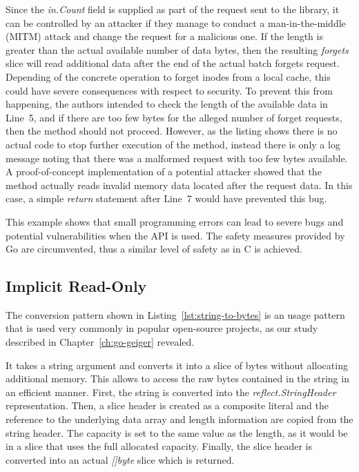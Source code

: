 Since the \textit{in.Count} field is supplied as part of the request sent to the library, it can be controlled by an
attacker if they manage to conduct a man-in-the-middle (\acrshort{MITM}) attack and change the request for a malicious
one.
If the length is greater than the actual available number of data bytes, then the resulting \textit{forgets} slice will
read additional data after the end of the actual batch forgets request.
Depending of the concrete operation to forget inodes from a local cache, this could have severe consequences with
respect to security.
To prevent this from happening, the authors intended to check the length of the available data in Line~5, and if there
are too few bytes for the alleged number of forget requests, then the method should not proceed.
However, as the listing shows there is no actual code to stop further execution of the method, instead there is only a
log message noting that there was a malformed request with too few bytes available.
A proof-of-concept implementation of a potential attacker showed that the method actually reads invalid memory data
located after the request data.
In this case, a simple \textit{return} statement after Line~7 would have prevented this bug.

This example shows that small programming errors can lead to severe bugs and potential vulnerabilities when the
\unsafe{} \acrshort{API} is used.
The safety measures provided by Go are circumvented, thus a similar level of safety as in C is achieved.



\subsection{Implicit Read-Only}\label{subsec:unsafe-security-problems:slice-casts:read-only}

The conversion pattern shown in Listing~\ref{lst:string-to-bytes} is an \unsafe{} usage pattern that is used very
commonly in popular open-source projects, as our study described in Chapter~\ref{ch:go-geiger} revealed.



It takes a string argument and converts it into a slice of bytes without allocating additional memory.
This allows to access the raw bytes contained in the string in an efficient manner.
First, the string is converted into the \textit{reflect.StringHeader} representation.
Then, a slice header is created as a composite literal and the reference to the underlying data array and length
information are copied from the string header.
The capacity is set to the same value as the length, as it would be in a slice that uses the full allocated capacity.
Finally, the slice header is converted into an actual \textit{[]byte} slice which is returned.

